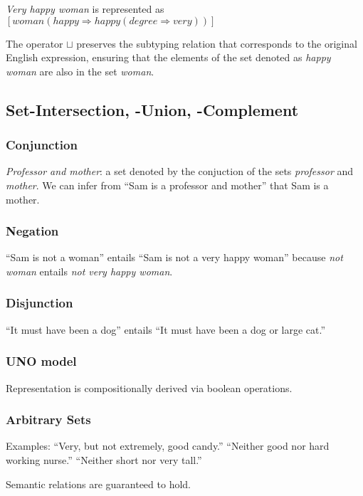 \documentclass[11pt]{article}
\begin{document}
\emph{Very happy woman} is represented as $[ woman(happy \Rightarrow happy(degree \Rightarrow very)) ]$

The operator $\sqcup$ preserves the subtyping relation that corresponds to the original English expression, ensuring that the elements of the set denoted as \emph{happy woman} are also in the set \emph{woman}.

\subsection{Set-Intersection, -Union, -Complement}

\subsubsection{Conjunction}

\emph{Professor and mother}: a set denoted by the conjuction of the sets \emph{professor} and \emph{mother}.  We can infer from ``Sam is a professor and mother'' that Sam is a mother.

\subsubsection{Negation}

``Sam is not a woman'' entails ``Sam is not a very happy woman'' because \emph{not woman} entails \emph{not very happy woman}.

\subsubsection{Disjunction}

``It must have been a dog'' entails ``It must have been a dog or large cat.''

\subsubsection{UNO model}

Representation is compositionally derived via boolean operations.

\subsubsection{Arbitrary Sets}

Examples: ``Very, but not extremely, good candy.'' ``Neither good nor hard working nurse.'' ``Neither short nor very tall.''

Semantic relations are guaranteed to hold.
\end{document}
